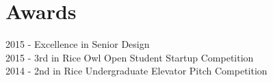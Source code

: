 \documentclass[]{deedy-resume-openfont}
\begin{document}
\begin{minipage}[t]{0.25\textwidth}

\section{Awards}
2015 - Excellence in Senior Design \\
2015 - 3rd in Rice Owl Open Student Startup Competition \\
2014 - 2nd in Rice Undergraduate Elevator Pitch Competition
\sectionsep

%
%

\end{minipage} 
\hfill
\end{document}
